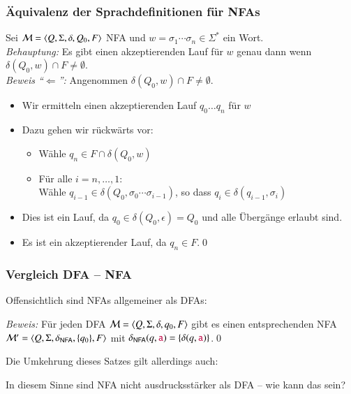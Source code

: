 \documentclass[onlymath]{beamer}
\begin{document}
\begin{frame}[t]\frametitle{Äquivalenz der Sprachdefinitionen für NFAs}

Sei $\mathcal{M}=\langle{Q,\Sigma,\delta,Q_0,F}\rangle$ NFA und $w=\sigma_1\cdots\sigma_n\in\Sigma^*$ ein Wort.\\[1ex]

\emph{Behauptung:} Es gibt einen akzeptierenden Lauf für $w$ genau dann wenn
$\delta(Q_0,w)\cap F \neq \emptyset$.\\[1ex]

\emph{Beweis "`$\Leftarrow$"':}
Angenommen $\delta(Q_0,w)\cap F \neq \emptyset$.\pause
\begin{itemize}
\item Wir ermitteln einen akzeptierenden Lauf $q_0\ldots q_n$ für $w$\pause
\item Dazu gehen wir rückwärts vor:
\begin{itemize}
\item Wähle $q_n\in F\cap\delta(Q_0,w)$
\item Für alle $i=n,\ldots,1$:\\
Wähle $q_{i-1}\in\delta(Q_0,\sigma_0\cdots\sigma_{i-1})$, so dass $q_i\in\delta(q_{i-1},\sigma_i) $ 
\end{itemize}\pause
\item Dies ist ein Lauf, da $q_0\in\delta(Q_0,\epsilon)=Q_0$ und alle Übergänge erlaubt sind.
\item Es ist ein akzeptierender Lauf, da $q_n\in F$.\qed
\end{itemize}
\end{frame}



\begin{frame}\frametitle{Vergleich DFA -- NFA}

Offensichtlich sind NFAs allgemeiner als DFAs:


\emph{Beweis:} Für jeden DFA  $\mathcal{M}=\langle{Q,\Sigma,\delta,q_0,F}\rangle$ gibt es
einen entsprechenden NFA $\mathcal{M}'=\langle{Q,\Sigma,\delta_{\textsf{NFA}},\{q_0\},F}\rangle$
mit $\delta_{\textsf{NFA}}(q,\mathtt{\textcolor{purple}{a}}) = \{\delta(q,\mathtt{\textcolor{purple}{a}})\}$.\qed
\bigskip
\pause

Die Umkehrung dieses Satzes gilt allerdings auch:

In diesem Sinne sind NFA nicht ausdrucksstärker als DFA -- wie kann das sein?

\end{frame}
\end{document}
